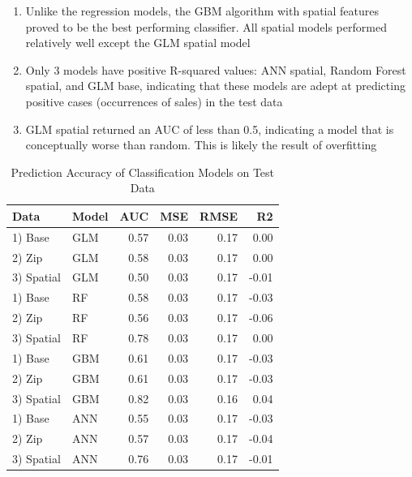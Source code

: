 \documentclass[conference,final,]{IEEEtran}
\providecommand{\tightlist}{%
  \setlength{\itemsep}{0pt}\setlength{\parskip}{0pt}}
\begin{document}
\begin{enumerate}
\def\labelenumi{\arabic{enumi})}
\tightlist
\item
  Unlike the regression models, the GBM algorithm with spatial features
  proved to be the best performing classifier. All spatial models
  performed relatively well except the GLM spatial model
\item
  Only 3 models have positive R-squared values: ANN spatial, Random
  Forest spatial, and GLM base, indicating that these models are adept
  at predicting positive cases (occurrences of sales) in the test data
\item
  GLM spatial returned an AUC of less than 0.5, indicating a model that
  is conceptually worse than random. This is likely the result of
  overfitting
\end{enumerate}

\begin{table}

\caption{\label{tab:Class Model Compare}\label{tab:ClassModelTable} Prediction Accuracy of Classification Models on Test Data}
\centering
\begin{tabular}[t]{l|l|r|r|r|r}
\hline
Data & Model & AUC & MSE & RMSE & R2\\
\hline
1) Base & GLM & 0.57 & 0.03 & 0.17 & 0.00\\
\hline
2) Zip & GLM & 0.58 & 0.03 & 0.17 & 0.00\\
\hline
3) Spatial & GLM & 0.50 & 0.03 & 0.17 & -0.01\\
\hline
1) Base & RF & 0.58 & 0.03 & 0.17 & -0.03\\
\hline
2) Zip & RF & 0.56 & 0.03 & 0.17 & -0.06\\
\hline
3) Spatial & RF & 0.78 & 0.03 & 0.17 & 0.00\\
\hline
1) Base & GBM & 0.61 & 0.03 & 0.17 & -0.03\\
\hline
2) Zip & GBM & 0.61 & 0.03 & 0.17 & -0.03\\
\hline
3) Spatial & GBM & 0.82 & 0.03 & 0.16 & 0.04\\
\hline
1) Base & ANN & 0.55 & 0.03 & 0.17 & -0.03\\
\hline
2) Zip & ANN & 0.57 & 0.03 & 0.17 & -0.04\\
\hline
3) Spatial & ANN & 0.76 & 0.03 & 0.17 & -0.01\\
\hline
\end{tabular}
\end{table}
\end{document}
